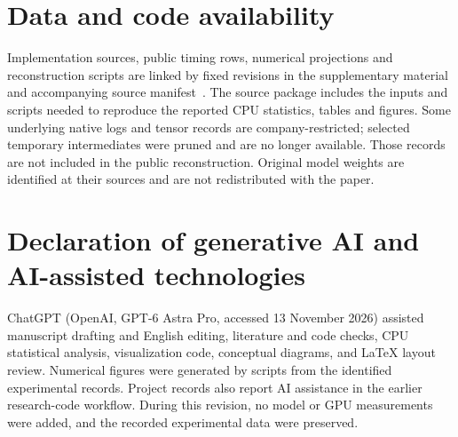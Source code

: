 \section*{Data and code availability}
Implementation sources, public timing rows, numerical projections and reconstruction scripts are linked by fixed revisions in the supplementary material and accompanying source manifest~\cite{records}. The source package includes the inputs and scripts needed to reproduce the reported CPU statistics, tables and figures. Some underlying native logs and tensor records are company-restricted; selected temporary intermediates were pruned and are no longer available. Those records are not included in the public reconstruction. Original model weights are identified at their sources and are not redistributed with the paper.

\section*{Declaration of generative AI and AI-assisted technologies}
ChatGPT (OpenAI, GPT-6 Astra Pro, accessed 13 November 2026) assisted manuscript drafting and English editing, literature and code checks, CPU statistical analysis, visualization code, conceptual diagrams, and LaTeX layout review. Numerical figures were generated by scripts from the identified experimental records. Project records also report AI assistance in the earlier research-code workflow. During this revision, no model or GPU measurements were added, and the recorded experimental data were preserved.
